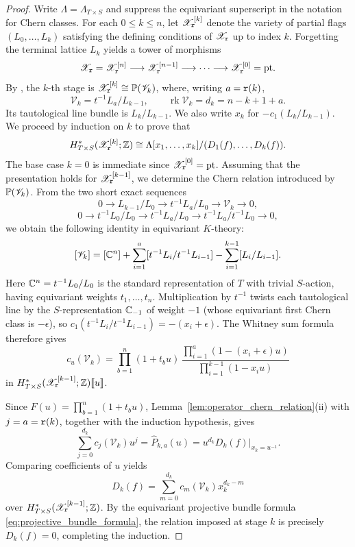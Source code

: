 \begin{proof}
Write $\Lambda=\Lambda_{T\times S}$ and suppress the equivariant superscript in the notation for Chern classes.
For each $0\leq k\leq n$, let $\mathscr X_{\mathtt r}^{[k]}$ denote the variety of partial flags $(L_0,\dots,L_k)$
satisfying the defining conditions of $\mathscr X_{\mathtt r}$ up to index $k$.
Forgetting the terminal lattice $L_k$ yields a tower of morphisms
\[
  \mathscr X_{\mathtt r}=\mathscr X_{\mathtt r}^{[n]}\longrightarrow\mathscr X_{\mathtt r}^{[n-1]}\longrightarrow\cdots
  \longrightarrow\mathscr X_{\mathtt r}^{[0]}=\mathrm{pt}.
\]
By \cite[Proposition~2.1]{kamnitzer2024fixed}, the $k$-th stage is
$\mathscr X_{\mathtt r}^{[k]}\cong\mathbb P(\mathscr V_k)$, where, writing $a=\mathtt r(k)$,
\[
 \mathscr V_k=t^{-1}L_a/L_{k-1},\qquad \operatorname{rk}\mathscr V_k=d_k=n-k+1+a.
\]
Its tautological line bundle is $L_k/L_{k-1}$. We also write $x_k$ for $-c_1(L_k/L_{k-1})$.
We proceed by induction on $k$ to prove that
\[
  H^*_{T\times S}(\mathscr X_{\mathtt r}^{[k]};\mathbb Z)
  \cong\Lambda[x_1,\dots,x_k]/(D_1(f),\dots,D_k(f)).
\]
The base case $k=0$ is immediate since $\mathscr X_{\mathtt r}^{[0]}=\mathrm{pt}$.
Assuming that the presentation holds for $\mathscr X_{\mathtt r}^{[k-1]}$, we determine the Chern
relation introduced by $\mathbb P(\mathscr V_k)$.
From the two short exact sequences
\[
  0\longrightarrow L_{k-1}/L_0\longrightarrow t^{-1}L_a/L_0\longrightarrow\mathscr V_k\longrightarrow0,
\]
\[
  0\longrightarrow t^{-1}L_0/L_0\longrightarrow t^{-1}L_a/L_0
    \longrightarrow t^{-1}L_a/t^{-1}L_0\longrightarrow0,
\]
we obtain the following identity in equivariant $K$-theory:
\[
  [\mathscr V_k]
   =[\mathbb C^n]+\sum_{i=1}^{a}[t^{-1}L_i/t^{-1}L_{i-1}]
            -\sum_{i=1}^{k-1}[L_i/L_{i-1}].
\]
Here $\mathbb C^n=t^{-1}L_0/L_0$ is the standard representation of $T$ with trivial
$S$-action, having equivariant weights $t_1,\dots,t_n$.
Multiplication by $t^{-1}$ twists each tautological line by the $S$-representation $\mathbb C_{-1}$ of weight $-1$ (whose equivariant first Chern class is $-\epsilon$),
so $c_1(t^{-1}L_i/t^{-1}L_{i-1})=-(x_i+\epsilon)$.
The Whitney sum formula therefore gives
\begin{equation}\label{eq:chern_polynomial_Vk}
  c_u(\mathscr V_k)
  =\prod_{b=1}^n(1+t_bu)\,
    \frac{\prod_{i=1}^{a}(1-(x_i+\epsilon)u)}
         {\prod_{i=1}^{k-1}(1-x_i u)}
\end{equation}
in $H^*_{T\times S}(\mathscr X_{\mathtt r}^{[k-1]};\mathbb Z)\llbracket u\rrbracket$.

Since $F(u)=\prod_{b=1}^n(1+t_bu)$, Lemma~\ref{lem:operator_chern_relation}(ii)
with $j=a=\mathtt r(k)$, together with the induction hypothesis, gives
\[
  \sum_{j=0}^{d_k}c_j(\mathscr V_k)u^j
   =\widehat P_{k,a}(u)
   =u^{d_k}D_k(f)\big|_{x_k=u^{-1}}.
\]
Comparing coefficients of $u$ yields
\[
  D_k(f)=\sum_{m=0}^{d_k}c_m(\mathscr V_k)x_k^{d_k-m}
\]
over $H^*_{T\times S}(\mathscr X_{\mathtt r}^{[k-1]};\mathbb Z)$.
By the equivariant projective bundle formula \eqref{eq:projective_bundle_formula},
the relation imposed at stage $k$ is precisely $D_k(f)=0$, completing the induction.
\end{proof}

